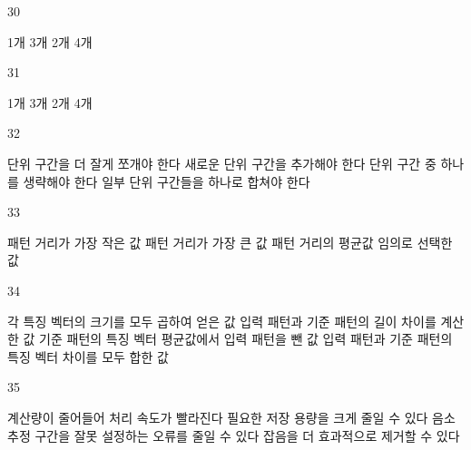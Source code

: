 \documentclass[fs9,seriesRus]{korfarm-base}
\begin{document}
\begin{kfSentenceUnit}{30}{}
\begin{kfChoices}
\kfChoice 1개
\kfChoice 3개
\kfChoice 2개
\kfChoice 4개
\end{kfChoices}
\end{kfSentenceUnit}

\begin{kfSentenceUnit}{31}{}
\begin{kfChoices}
\kfChoice 1개
\kfChoice 3개
\kfChoice 2개
\kfChoice 4개
\end{kfChoices}
\end{kfSentenceUnit}

\begin{kfSentenceUnit}{32}{}
\begin{kfChoices}
\kfChoice 단위 구간을 더 잘게 쪼개야 한다
\kfChoice 새로운 단위 구간을 추가해야 한다
\kfChoice 단위 구간 중 하나를 생략해야 한다
\kfChoice 일부 단위 구간들을 하나로 합쳐야 한다
\end{kfChoices}
\end{kfSentenceUnit}

\begin{kfSentenceUnit}{33}{}
\begin{kfChoices}
\kfChoice 패턴 거리가 가장 작은 값
\kfChoice 패턴 거리가 가장 큰 값
\kfChoice 패턴 거리의 평균값
\kfChoice 임의로 선택한 값
\end{kfChoices}
\end{kfSentenceUnit}

\begin{kfSentenceUnit}{34}{}
\begin{kfChoices}
\kfChoice 각 특징 벡터의 크기를 모두 곱하여 얻은 값
\kfChoice 입력 패턴과 기준 패턴의 길이 차이를 계산한 값
\kfChoice 기준 패턴의 특징 벡터 평균값에서 입력 패턴을 뺀 값
\kfChoice 입력 패턴과 기준 패턴의 특징 벡터 차이를 모두 합한 값
\end{kfChoices}
\end{kfSentenceUnit}

\begin{kfSentenceUnit}{35}{}
\begin{kfChoices}
\kfChoice 계산량이 줄어들어 처리 속도가 빨라진다
\kfChoice 필요한 저장 용량을 크게 줄일 수 있다
\kfChoice 음소 추정 구간을 잘못 설정하는 오류를 줄일 수 있다
\kfChoice 잡음을 더 효과적으로 제거할 수 있다
\end{kfChoices}
\end{kfSentenceUnit}
\end{document}
